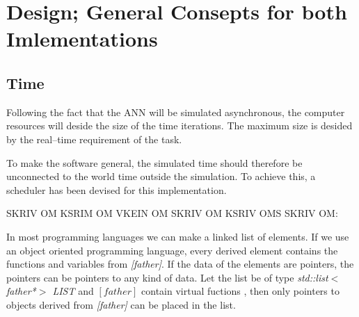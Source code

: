 \section{Design; General Consepts for both Imlementations}










	\subsection{Time}
	\label{ssecTime}
Following the fact that the ANN will be simulated asynchronous, the computer resources will deside the size of the time iterations. The maximum size is desided by the real--time requirement of the task.

To make the software general, the simulated time should therefore be unconnected to the world time outside the simulation. To achieve this, a scheduler has been devised for this implementation.

SKRIV OM KSRIM OM VKEIN OM SKRIV OM KSRIV OMS SKRIV OM:

In most programming languages we can make a linked list of elements. %
If we use an object oriented programming language, every derived element contains the functions and variables from \emph{[father]}. 
If the data of the elements are pointers, the pointers can be pointers to any kind of data.  %
Let the list be of type \emph{std::list$<$father*$>$ LIST} and \emph{$[father]$} contain virtual fuctions %
, then only pointers to objects derived from \emph{[father]} can be placed in the list. 

